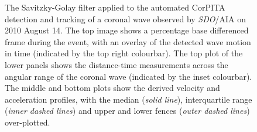 \documentclass[structabstract]{aa}
\begin{document}
\begin{figure}[!t]
\centering
{}
\caption{The Savitzky-Golay filter applied to the automated CorPITA detection and tracking of a coronal wave observed by \emph{SDO}/AIA on 2010 August 14. The top image shows a percentage base differenced frame during the event, with an overlay of the detected wave motion in time (indicated by the top right colourbar). The top plot of the lower panels shows the distance-time measurements across the angular range of the coronal wave (indicated by the inset colourbar). The middle and bottom plots show the derived velocity and acceleration profiles, with the median (\emph{solid line}), interquartile range (\emph{inner dashed lines}) and upper and lower fences (\emph{outer dashed lines}) over-plotted.}
\label{fig_savgol_wave_CorPITA}
\end{figure}
\end{document}
